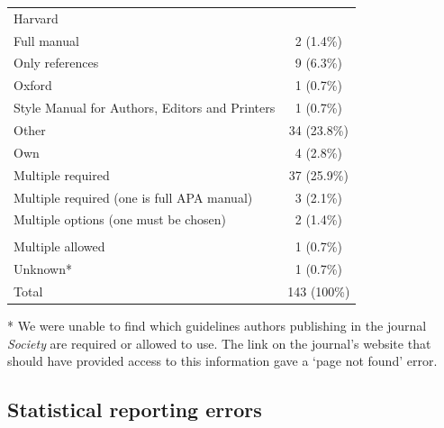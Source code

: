 \documentclass[
  12pt,
]{article}
\begin{document}
\begin{table}[H]
\begin{threeparttable}
\begin{tabular}[t]{lc}
\hspace{1em}Harvard & \\
\hspace{1em}\hspace{1em}Full manual & 2 (1.4\%)\\
\hspace{1em}\hspace{1em}Only references & 9 (6.3\%)\\
\hspace{1em}Oxford & 1 (0.7\%)\\
\hspace{1em}Style Manual for Authors, Editors and Printers & 1 (0.7\%)\\
\hspace{1em}Other & 34 (23.8\%)\\
\hspace{1em}Own & 4 (2.8\%)\\
\hspace{1em}Multiple required & 37 (25.9\%)\\
\hspace{1em}Multiple required (one is full APA manual) & 3 (2.1\%)\\
\hspace{1em}Multiple options (one must be chosen) & 2 (1.4\%)\\
\addlinespace[0.3em]
\multicolumn{2}{l}{\textbf{Other, namely...}}\\
\hspace{1em}Multiple allowed & 1 (0.7\%)\\
\hspace{1em}Unknown* & 1 (0.7\%)\\
\hspace{1em}Total & 143 (100\%)\\
\bottomrule
\end{tabular}
\begin{tablenotes}[para]
\item[*] We were unable to find which guidelines authors publishing in the journal \emph{Society} are required or allowed to use. The link on the journal's website that should have provided access to this information gave a ‘page not found’ error.
\end{tablenotes}
\end{threeparttable}
\end{table}

\hypertarget{statistical-reporting-errors}{%
\subsection{Statistical reporting
errors}\label{statistical-reporting-errors}}
\end{document}

